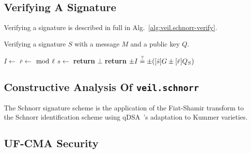 \subsection{Verifying A Signature}\label{subsec:veil.schnorr-verify}

Verifying a signature is described in full in Alg.~\ref{alg:veil.schnorr-verify}.

\begin{algorithm}[!htp]
    \caption{
        Verifying a signature $S$ with a message $M$ and a public key $Q$.
    }
    \begin{algorithmic}
            \State {}
            \State {}
            \State {}
            \State
            \State {}
            \State
            \State $I \gets $ 
            \State $\bar{r} \gets$  $\bmod~\ell$
            \State $s \gets $ 
                \State \textbf{return} $\bot$
            \EndIf
            \State
            \State \textbf{return} $\pm I \stackrel{?}{=} \pm ([\bar{s}]G \pm [\bar{r}]Q_S)$
        \EndFunction
    \end{algorithmic}
    \label{alg:veil.schnorr-verify}
\end{algorithm}

\subsection{Constructive Analysis Of \texttt{veil.schnorr}}\label{subsec:veil.schnorr-analysis}

The Schnorr signature scheme is the application of the Fiat-Shamir transform to the Schnorr identification scheme using
qDSA~\cite{renes2017}'s adaptation to Kummer varieties.

\subsection{UF-CMA Security}\label{subsec:veil.schnorr-uf-cma}

